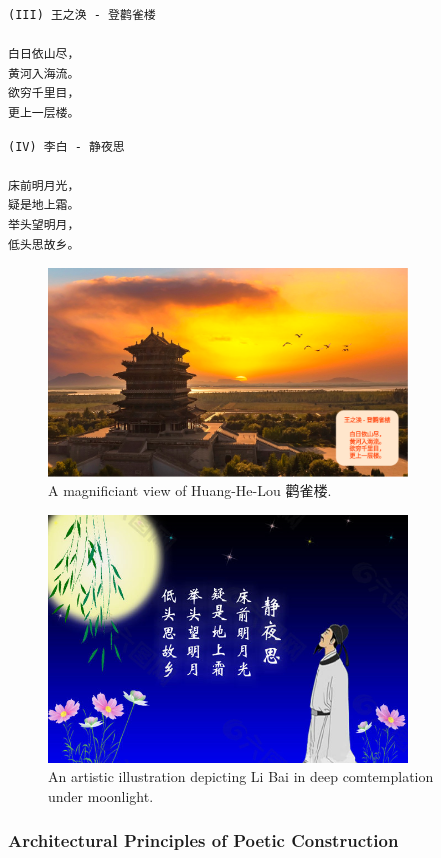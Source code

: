 \documentclass[11pt,letterpaper]{article}
\begin{document}
\begin{verbatim}
(III) 王之涣 - 登鹳雀楼

白日依山尽，
黄河入海流。
欲穷千里目，
更上一层楼。
\end{verbatim}

\begin{verbatim}
(IV) 李白 - 静夜思

床前明月光，
疑是地上霜。
举头望明月，
低头思故乡。
\end{verbatim}

\begin{figure}
\centering
\includegraphics[width=0.85\textwidth]{./images/poem_huang-he-lou.png}
\caption{A magnificiant view of Huang-He-Lou 鹳雀楼.}
\end{figure}

\begin{figure}
\centering
\includegraphics[width=0.85\textwidth]{./images/poem_moonlight.jpg}
\caption{An artistic illustration depicting Li Bai in deep comtemplation
under moonlight.}
\end{figure}

\subsubsection{Architectural Principles of Poetic Construction}\label{architectural-principles-of-poetic-construction}
\end{document}
